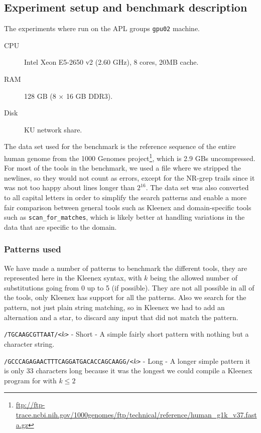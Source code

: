 \subsection{Experiment setup and benchmark description}
The experiments where run on the APL groups \texttt{gpu02} machine.
\begin{description}
    \item[CPU] Intel Xeon E5-2650 v2 (2.60 GHz), 8 cores, 20MB cache.
    \item[RAM] 128 GB (8 $\times$ 16 GB DDR3).
    \item[Disk] KU network share.
\end{description}

The data set used for the benchmark is the reference sequence of the entire
human genome from the 1000 Genomes
project\footnote{\url{ftp://ftp-trace.ncbi.nih.gov/1000genomes/ftp/technical/reference/human_g1k_v37.fasta.gz}},
which is 2.9 GBs uncompressed. For most of the tools in the benchmark, we used
a file where we stripped the newlines, so they would not count as errors,
except for the NR-grep trails since it was not too happy about lines longer
than $2^{16}$. The data set was also converted to all capital letters in order
to simplify the search patterns and enable a more fair comparison between
general tools such as Kleenex and domain-specific tools such as
\texttt{scan\_for\_matches}, which is likely better at handling variations in
the data that are specific to the domain.

\subsubsection{Patterns used}
We have made a number of patterns to benchmark the different tools, they are
represented here in the Kleenex syntax, with $k$ being the allowed number of
substitutions going from 0 up to 5 (if possible). They are not all possible in
all of the tools, only Kleenex has support for all the patterns. Also we search
for the pattern, not just plain string matching, so in Kleenex we had to add an
alternation and a star, to discard any input that did not match the pattern.

\texttt{/TGCAAGCGTTAAT/<$k$>} - Short - A simple fairly short pattern with
nothing but a character string.

\texttt{/GCCCAGAGAACTTTCAGGATGACACCAGCAAGG/<$k$>} - Long - A longer simple
pattern it is only 33 characters long because it was the longest we could
compile a Kleenex program for with $k \leq 2$

